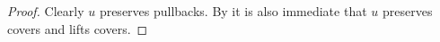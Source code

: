 \begin{proof}
Clearly $u$ preserves pullbacks.
By  it is also immediate that $u$ preserves covers and lifts covers.
\end{proof}